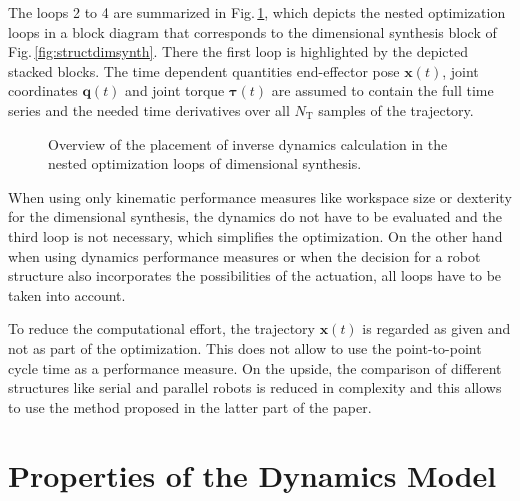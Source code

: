 \documentclass{svproc}
\newcommand{\bm}[1]{\boldsymbol{#1}}
\begin{document}
The loops 2 to 4 are summarized in Fig.\,\ref{fig:dimsynth_dyn_std}, which depicts the nested optimization loops in a block diagram that corresponds to the dimensional synthesis block of Fig.\,\ref{fig:structdimsynth}.
There the first loop is highlighted by the depicted stacked blocks.
The time dependent quantities end-effector pose $\bm{x}(t)$, joint coordinates $\bm{q}(t)$ and joint torque $\bm{\tau}(t)$ are assumed to contain the full time series and the needed time derivatives over all $N_\mathrm{T}$ samples of the trajectory.

\begin{figure}[tb]
    
    \caption{Overview of the placement of inverse dynamics calculation in the nested optimization loops of dimensional synthesis.}
    \label{fig:dimsynth_dyn_std}
\end{figure} 

When using only kinematic performance measures like workspace size or dexterity for the dimensional synthesis, the dynamics do not have to be evaluated and the third loop is not necessary, which simplifies the optimization.
On the other hand when using dynamics performance measures or when the decision for a robot structure also incorporates the possibilities of the actuation, all loops have to be taken into account.

To reduce the computational effort, the trajectory $\bm{x}(t)$ is regarded as given and not as part of the optimization.
This does not allow to use the point-to-point cycle time as a performance measure.
On the upside, the comparison of different structures like serial and parallel robots is reduced in complexity and this allows to use the method proposed in the latter part of the paper.

\section{Properties of the Dynamics Model}
\label{sec:DynMdl}
\end{document}
